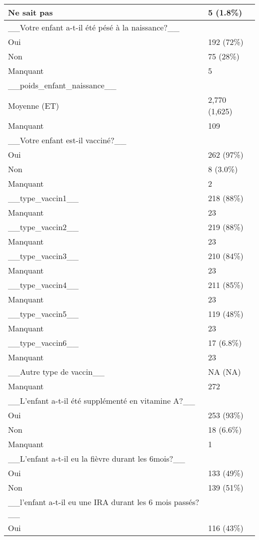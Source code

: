 \documentclass[
]{book}
\begin{document}
\begin{tabular}{l|l}
\hline
Ne sait pas & 5 (1.8\%)\\
\hline
\_\_Votre enfant a-t-il été pésé à la naissance?\_\_ & \\
\hline
Oui & 192 (72\%)\\
\hline
Non & 75 (28\%)\\
\hline
Manquant & 5\\
\hline
\_\_poids\_enfant\_naissance\_\_ & \\
\hline
Moyenne  (ET) & 2,770  (1,625)\\
\hline
Manquant & 109\\
\hline
\_\_Votre enfant est-il vacciné?\_\_ & \\
\hline
Oui & 262 (97\%)\\
\hline
Non & 8 (3.0\%)\\
\hline
Manquant & 2\\
\hline
\_\_type\_vaccin1\_\_ & 218 (88\%)\\
\hline
Manquant & 23\\
\hline
\_\_type\_vaccin2\_\_ & 219 (88\%)\\
\hline
Manquant & 23\\
\hline
\_\_type\_vaccin3\_\_ & 210 (84\%)\\
\hline
Manquant & 23\\
\hline
\_\_type\_vaccin4\_\_ & 211 (85\%)\\
\hline
Manquant & 23\\
\hline
\_\_type\_vaccin5\_\_ & 119 (48\%)\\
\hline
Manquant & 23\\
\hline
\_\_type\_vaccin6\_\_ & 17 (6.8\%)\\
\hline
Manquant & 23\\
\hline
\_\_Autre type de vaccin\_\_ & NA  (NA)\\
\hline
Manquant & 272\\
\hline
\_\_L'enfant a-t-il été supplémenté en vitamine A?\_\_ & \\
\hline
Oui & 253 (93\%)\\
\hline
Non & 18 (6.6\%)\\
\hline
Manquant & 1\\
\hline
\_\_L'enfant a-t-il eu la fièvre durant les 6mois?\_\_ & \\
\hline
Oui & 133 (49\%)\\
\hline
Non & 139 (51\%)\\
\hline
\_\_l'enfant a-t-il eu une IRA durant les 6 mois passés?\_\_ & \\
\hline
Oui & 116 (43\%)\\

\end{tabular}
\end{document}
